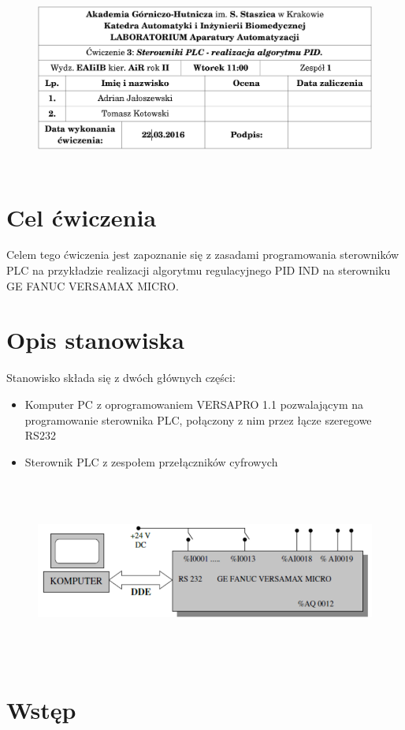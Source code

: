 \documentclass[a4paper, 12pt]{article}
\begin{document}
	\begin{figure}[H]
		\centering
		\includegraphics[height=6cm, width=\textwidth]{./img/lena.png}
	\end{figure}
	\section{Cel ćwiczenia}
		Celem tego ćwiczenia jest zapoznanie się z zasadami programowania sterowników PLC na przykładzie realizacji algorytmu regulacyjnego PID IND na sterowniku GE FANUC VERSAMAX MICRO.
	\section{Opis stanowiska}
		Stanowisko składa się z dwóch głównych części: 
		\begin{itemize}
			\item Komputer PC z oprogramowaniem VERSAPRO 1.1 pozwalającym na programowanie sterownika PLC, połączony z nim przez łącze szeregowe RS232
			\item Sterownik PLC z zespołem przełączników cyfrowych 
		\end{itemize}
		\begin{figure}[H]
			\centering
			\includegraphics[height=6cm, width=\textwidth]{./img/schemat.png}
		\end{figure}
	\section{Wstęp}
\end{document}
